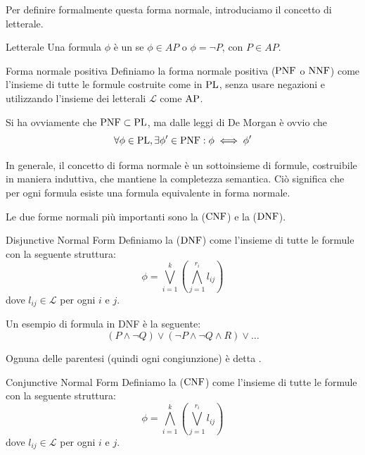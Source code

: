 Per definire formalmente questa forma normale, introduciamo il concetto di letterale.

\begin{definition}{Letterale}
  Una formula \(\phi\) è un  se \(\phi \in AP\) o \(\phi = \neg P \), con \(P \in AP\).
\end{definition}

\begin{definition}{Forma normale positiva}
  Definiamo la forma normale positiva (\(\operatorname{PNF}\) o \(\operatorname{NNF}\)) come l'insieme di tutte le formule costruite come in \(\operatorname{PL}\), senza usare negazioni e utilizzando l'insieme dei letterali \(\mathcal{L}\) come \(\AP\).
\end{definition}

Si ha ovviamente che \(\operatorname{PNF} \subset \operatorname{PL}\), ma dalle leggi di De Morgan è ovvio che
\[\forall \phi \in \operatorname{PL}, \exists \phi' \in \operatorname{PNF}: \phi \iff \phi'\]

In generale, il concetto di forma normale è un sottoinsieme di formule, costruibile in maniera induttiva, che mantiene la completezza semantica.
Ciò significa che per ogni formula esiste una formula equivalente in forma normale.

Le due forme normali più importanti sono la  (\(\operatorname{CNF}\)) e la  (\(\operatorname{DNF}\)).

\begin{definition}{Disjunctive Normal Form}
  Definiamo la  (\(\operatorname{DNF}\)) come l'insieme di tutte le formule con la seguente struttura:
  \[\phi = \bigvee_{i=1}^k\left(\bigwedge_{j=1}^{r_i} l_{ij}\right)\]
  dove \(l_{ij} \in \mathcal{L}\) per ogni \(i\) e \(j\).
\end{definition}

\begin{example}{}
  Un esempio di formula in DNF è la seguente:
  \[(P\land \neg Q) \lor (\neg P \land \neg Q \land R) \lor \ldots\]

  Ognuna delle parentesi (quindi ogni congiunzione) è detta .
\end{example}

\begin{definition}{Conjunctive Normal Form}
  Definiamo la  (\(\operatorname{CNF}\)) come l'insieme di tutte le formule con la seguente struttura:
  \[\phi = \bigwedge_{i=1}^k\left(\bigvee_{j=1}^{r_i} l_{ij}\right)\]
  dove \(l_{ij} \in \mathcal{L}\) per ogni \(i\) e \(j\).
\end{definition}

